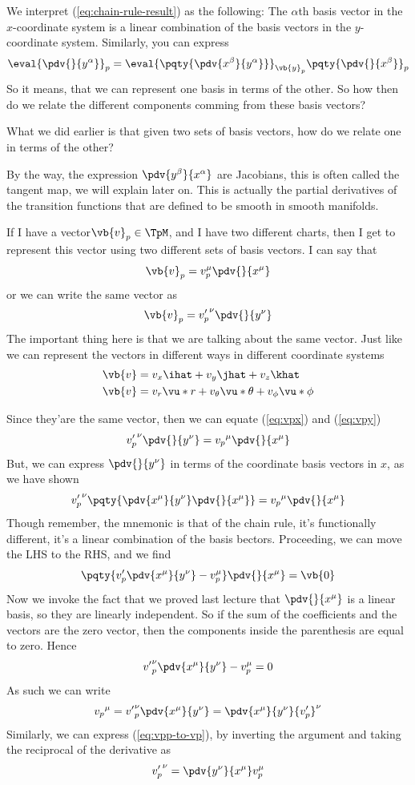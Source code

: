 We interpret (\ref{eq:chain-rule-result}) as the following: The $\alpha$th basis vector in the $x$-coordinate system
is a linear combination of the basis vectors in the $y$-coordinate system. Similarly, you can express
\[
	\eval{\pdv{}{y^\alpha}}_p =  
	\eval{\pqty{
		\pdv{x^\beta}{y^\alpha} 
	}}_{\vb{y}_p} 
	\pqty{{\pdv{}{x^\beta}}}_p
\]
So it means, that we can represent one basis in terms of the other. So how then do 
we relate the different components comming from these basis vectors? 

What we did earlier is that given two sets of basis vectors, how do we relate one in terms 
of the other?

By the way, the expression $\pdv{y^\beta}{x^\alpha}$ are Jacobians, this is often called the tangent map,
we will explain later on. This is actually the partial derivatives of the transition functions that are defined 
to be smooth in smooth manifolds. 

If I have a vector$ \vb{v}_p \in \TpM$, and I have two different charts, then I get 
to represent this vector using two different sets of basis vectors. I can say that
\[
	\vb{v}_p = v_p^\mu \pdv{}{x^\mu}
	\label{eq:vpx}
\]
or we can write the same vector as 
\[
	\vb{v}_p = {v'_p}^\nu \pdv{}{y^\nu}
	\label{eq:vpy}
\]
The important thing here is that we are talking about the same vector. Just like we can represent the vectors
in different ways in different coordinate systems
\begin{align*}
	\vb{v} &= v_x \ihat + v_y \jhat + v_z \khat\\
	\vb{v} &= v_r \vu*{r} + v_\theta \vu*{\theta} + v_\phi \vu*{\phi}
\end{align*}

Since they'are the same vector, then we can equate (\ref{eq:vpx}) and (\ref{eq:vpy})
\[
	{v'_p}^\nu \pdv{}{y^\nu}
	=	
	{v_p}^\mu \pdv{}{x^\mu}
\]
But, we can express $\pdv{}{y^\nu}$ in terms of the coordinate basis vectors in $x$, as we have shown
\[
	{v'_p}^\nu
	\pqty{
		\pdv{x^\mu}{y^\nu}
		\pdv{}{x^\mu} 
	}
	=	
	{v_p}^\mu \pdv{}{x^\mu}
\]
Though remember, the mnemonic is that of the chain rule, it's functionally different, it's a linear combination of the basis bectors.
Proceeding, we can move the LHS to the RHS, and we find
\[
	\pqty{
		v'_p \pdv{x^\mu}{y^\nu} - v_p^\mu
	}
	\pdv{}{x^\mu}
	=
	\vb{0}
\]
Now we invoke the fact that we proved last lecture that $\pdv{}{x^\mu}$ is 
a linear basis, so they are linearly independent. So if the sum of the 
coefficients and the vectors are the zero vector, then the components inside the 
parenthesis are equal to zero. Hence
\[
	{v'}_p^\nu \pdv{x^\mu}{y^\nu} - v_p^\mu
	=
	0
\]
As such we can write
\[
	{v_p}^\mu = 
	{v'}_p^\nu \pdv{x^\mu}{y^\nu}  
	= 
	\pdv{x^\mu}{y^\nu}  {v'_p}^\nu
	\label{eq:vpp-to-vp} 
\]
Similarly, we can express (\ref{eq:vpp-to-vp}), by inverting the 
argument and taking the reciprocal of the derivative as
\[
	{v'_p}^\nu = 
	\pdv{y^\nu}{x^\mu} v_p^\mu 
	\label{eq:vp-to-vpp}
\]

